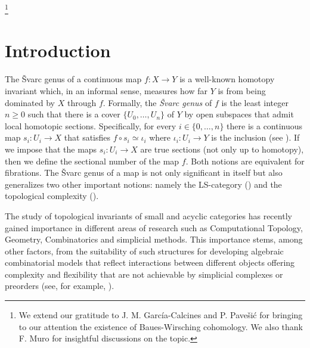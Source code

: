 \documentclass[12pt,reqno]{amsart}
\theoremstyle{definition}
\theoremstyle{remark}
\numberwithin{figure}{section}%
\begin{document}



\thanks{We extend our gratitude to J. M. García-Calcines and P. Pavešić for bringing to our attention the existence of Baues-Wirsching cohomology. We also thank F. Muro for insightful discussions on the topic.}

\maketitle




\section*{Introduction}\label{sec: Prelim}

The \v{S}varc genus of a continuous map $f\colon X\to Y$ is a well-known homotopy invariant which, in an informal sense, measures how far $Y$ is from being dominated by $X$ through $f$. Formally, the {\em \v{S}varc genus} of $f$ is the least integer $n\geq 0$ such that there is a cover $\{U_0, \ldots, U_n \}$ of $Y$ by open subspaces that admit local homotopic sections. Specifically, for every $i \in \{0, \ldots, n\} $ there is a continuous map $s_i \colon U_i \rightarrow X$ that satisfies $f \circ s_i \simeq \iota_i$ where $\iota_i \colon U_i \rightarrow Y$ is the inclusion (see \cite{Svarc}). If we impose that the maps $s_i \colon U_i \rightarrow X$ are true sections (not only up to homotopy), then we define the sectional number of the map $f$. Both notions are equivalent for fibrations. The \v{S}varc genus of a map is not only significant in itself but also generalizes two other important notions: namely the LS-category (\cite{CLOT}) and the topological complexity (\cite{FARBER}). 

The study of topological invariants of small and acyclic categories has recently gained importance in different areas of research such as Computational Topology, Geometry, Combinatorics and simplicial methods. This importance stems, among other factors, from the suitability of such structures for developing algebraic combinatorial models that reflect interactions between different objects offering complexity and flexibility that are not achievable by simplicial complexes or preorders (see, for example, \cite{Bridson_Haefliger,KOZLOV}). 
\end{document}
